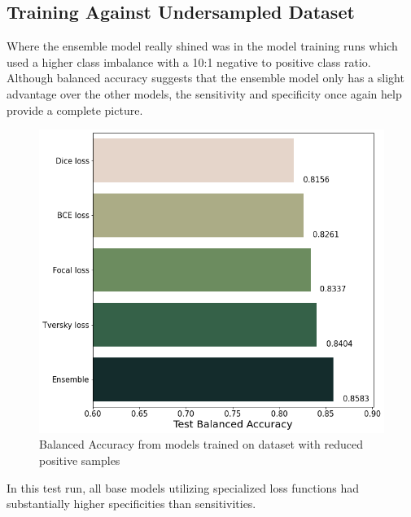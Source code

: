 \documentclass[conference]{IEEEtran}
\begin{document}
\subsection{Training Against Undersampled Dataset}
Where the ensemble model really shined was in the model training
runs which used a higher class imbalance with a 10:1 negative to positive class
ratio.  Although balanced accuracy suggests that the ensemble model only has a
slight advantage over the other models, the sensitivity and specificity once
again help provide a complete picture.
\begin{figure}[tp]
  \centering
  \includegraphics[scale=0.2]{undersampled_data_balanced_accuracy.png}
  \caption{Balanced Accuracy from models trained on dataset with reduced positive samples}
  \label{undersampled_data_balanced_accuracy}
\end{figure}
In this test run, all base models utilizing specialized loss functions had
substantially higher specificities than sensitivities.
\end{document}
